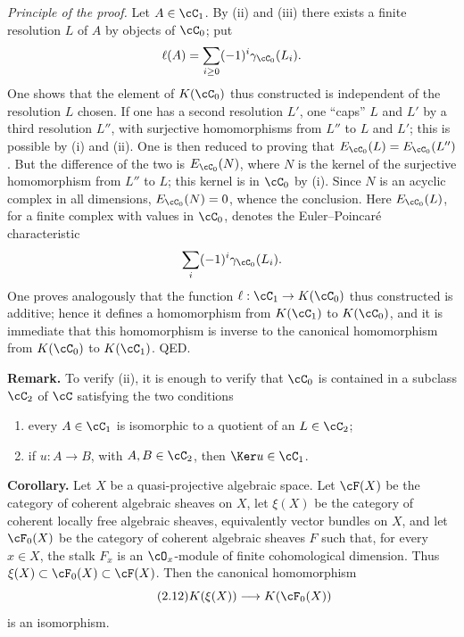 \emph{Principle of the proof.} Let $A\in\cC_1$. By (ii) and (iii) there exists a finite resolution $L$ of $A$ by objects of $\cC_0$; put
\[
 \ell(A)=\sum_{i\geq 0}(-1)^i\gamma_{\cC_0}(L_i).
\]
One shows that the element of $K(\cC_0)$ thus constructed is independent of the resolution $L$ chosen. If one has a second resolution $L'$, one ``caps'' $L$ and $L'$ by a third resolution $L''$, with surjective homomorphisms from $L''$ to $L$ and $L'$; this is possible by (i) and (ii). One is then reduced to proving that $E_{\cC_0}(L)=E_{\cC_0}(L'')$. But the difference of the two is $E_{\cC_0}(N)$, where $N$ is the kernel of the surjective homomorphism from $L''$ to $L$; this kernel is in $\cC_0$ by (i). Since $N$ is an acyclic complex in all dimensions, $E_{\cC_0}(N)=0$, whence the conclusion. Here $E_{\cC_0}(L)$, for a finite complex with values in $\cC_0$, denotes the Euler--Poincar\'e characteristic
\[
 \sum_i (-1)^i\gamma_{\cC_0}(L_i).
\]
One proves analogously that the function $\ell:\cC_1\to K(\cC_0)$ thus constructed is additive; hence it defines a homomorphism from $K(\cC_1)$ to $K(\cC_0)$, and it is immediate that this homomorphism is inverse to the canonical homomorphism from $K(\cC_0)$ to $K(\cC_1)$. QED.

\textbf{Remark.} To verify (ii), it is enough to verify that $\cC_0$ is contained in a subclass $\cC_2$ of $\cC$ satisfying the two conditions
\begin{enumerate}[label=(ii \alph*)]
\item every $A\in\cC_1$ is isomorphic to a quotient of an $L\in\cC_2$;
\item if $u:A\to B$, with $A,B\in\cC_2$, then $\Ker u\in\cC_1$.
\end{enumerate}

\textbf{Corollary.} Let $X$ be a quasi-projective algebraic space. Let $\cF(X)$ be the category of coherent algebraic sheaves on $X$, let $\xi(X)$ be the category of coherent locally free algebraic sheaves, equivalently vector bundles on $X$, and let $\cF_0(X)$ be the category of coherent algebraic sheaves $F$ such that, for every $x\in X$, the stalk $F_x$ is an $\cO_x$-module of finite cohomological dimension. Thus $\xi(X)\subset\cF_0(X)\subset\cF(X)$. Then the canonical homomorphism
\begin{equation}\tag{2.12}
 K(\xi(X))\longrightarrow K(\cF_0(X))
\end{equation}
is an isomorphism.

